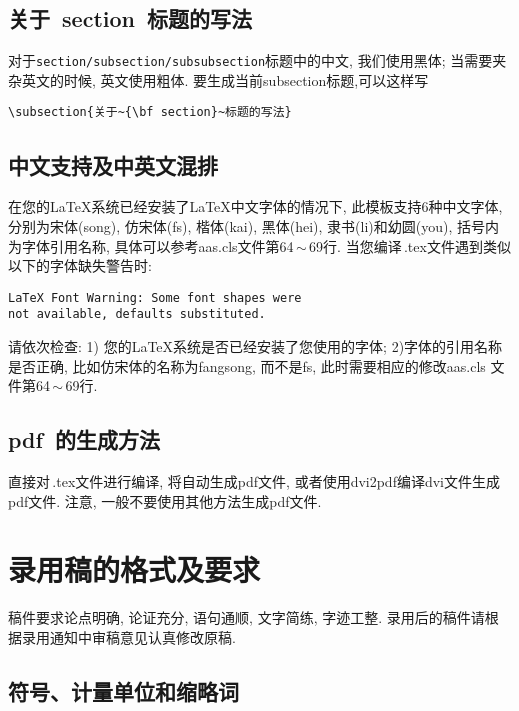 \documentclass{aas}
\begin{document}
\subsection{关于~{\bf section}~标题的写法}

对于\verb|section/subsection/subsubsection|标题中的中文, 我们使用黑体; 当需要夹杂英文的时候, 英文使用粗体. 要生成当前subsection标题,可以这样写
\begin{verbatim}
\subsection{关于~{\bf section}~标题的写法}
\end{verbatim}

\subsection{中文支持及中英文混排}

在您的\LaTeX 系统已经安装了\LaTeX 中文字体的情况下, 此模板支持6种中文字体, 分别为宋体(song), 仿宋体(fs), 楷体(kai), 黑体(hei), 隶书(li)和幼圆(you), 括号内为字体引用名称, 具体可以参考aas.cls文件第64\,$\sim$\,69行. 当您编译\,.tex文件遇到类似以下的字体缺失警告时:
\begin{verbatim}
LaTeX Font Warning: Some font shapes were
not available, defaults substituted.
\end{verbatim}
请依次检查: 1) 您的\LaTeX 系统是否已经安装了您使用的字体; 2)字体的引用名称是否正确, 比如仿宋体的名称为fangsong, 而不是fs, 此时需要相应的修改aas.cls 文件第64\,$\sim$\,69行.

\subsection{{\bf pdf}~的生成方法}

直接对\,.tex文件进行编译, 将自动生成pdf文件,
或者使用dvi2pdf编译dvi文件生成pdf文件. 注意,
一般不要使用其他方法生成pdf文件.

\section{录用稿的格式及要求}

稿件要求论点明确, 论证充分, 语句通顺, 文字简练, 字迹工整. 录用后的稿件请根据录用通知中审稿意见认真修改原稿.

\subsection{符号、计量单位和缩略词}
\end{document}
